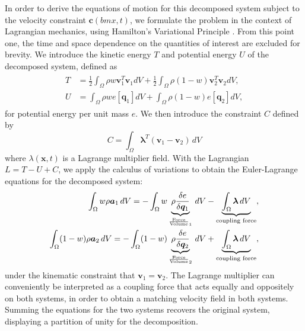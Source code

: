 In order to derive the equations of motion for this decomposed system subject to the velocity constraint $\bm{c}(bm{x},t)$, we formulate the problem in the context of Lagrangian mechanics, using Hamilton's Variational Principle \cite{Lanczos:2012}. From this point one, the time and space dependence on the quantities of interest are excluded for brevity. We introduce the kinetic energy $T$ and potential energy $U$ of the decomposed system, defined as
\begin{align}
\begin{aligned}
T &= \frac{1}{2} \int_\Omega \rho w \bm{v}_1^T \bm{v}_1 dV + \frac{1}{2} \int_\Omega \rho (1-w) \bm{v}_2^T \bm{v}_2 dV, \\
U &= \int_\Omega \rho w e[\bm{q}_1] dV + \int_\Omega \rho (1-w) e[\bm{q}_2] dV,
\end{aligned}
\end{align}
for potential energy per unit mass $e$. We then introduce the constraint $C$ defined by
\begin{equation}
C = \int_\Omega \bm{\lambda}^T (\bm{v}_1 - \bm{v}_2) \,dV
\end{equation}
where $\lambda\left(\mathbf{x},t\right)$ is a
Lagrange multiplier field. With the Lagrangian $L=T-U+C$, we apply the calculus of variations to obtain the Euler-Lagrange equations for the decomposed system:
\begin{align}
\label{eq:coupling}
\begin{aligned}
\int_\Omega w \rho \bm{a}_1 \,dV = - \int_\Omega w \underbrace{\rho \frac{\delta e}{\delta \bm{q}_1}}_{\frac{\text{Force}}{\text{Volume}}_1} \,dV - \underbrace{\int_\Omega \bm{\lambda}\, dV}_{\textrm{\scriptsize  coupling force}} , \\
\int_\Omega (1-w) \rho \bm{a}_2 \,dV = - \int_\Omega (1-w) \underbrace{\rho \frac{\delta e}{\delta \bm{q}_2}}_{\frac{\text{Force}}{\text{Volume}}_2} \,dV + \underbrace{\int_\Omega \bm{\lambda}\, dV}_{\footnotesize\textrm{\scriptsize  coupling force}} ,
\end{aligned}
\end{align}
under the kinematic constraint that $\bm{v}_1=\bm{v}_2$. The Lagrange multiplier can conveniently be interpreted as a coupling force that acts equally and oppositely on both systems, in order to obtain a matching velocity field in both systems. Summing the equations for the two systems recovers the original system, displaying a partition of unity for the decomposition. 

